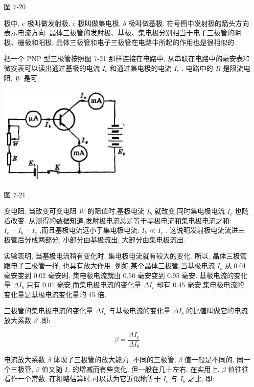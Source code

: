 \documentclass[10pt]{article}
\begin{document}
图 7-20

极中, \(e\) 极叫做发射极, \(c\) 极叫做集电极, \(b\) 极叫做基极. 符号图中发射极的箭头方向表示电流方向. 晶体三极管的发射极、基极、集电极分别相当于电子三极管的阴极、栅极和阳极. 晶体三极管和电子三极管在电路中所起的作用也是很相似的.

把一个 PNP 型三极管按照图 7-21 那样连接在电路中, 从串联在电路中的毫安表和微安表可以读出通过基极的电流 \({I}_{b}\) 和通过集电极的电流 \({I}_{c}\) . 电路中的 \(R\) 是限流电阻, \(W\) 是可

\begin{center}
\includegraphics[max width=0.5\textwidth]{images/01913056-1f15-74d8-9184-9aab52c9d66b_232_266290.jpg}
\end{center}

图 7-21

变电阻. 当改变可变电阻 \(W\) 的阻值时,基极电流 \({I}_{b}\) 就改变,同时集电极电流 \({I}_{c}\) 也随着改变. 从测得的数据知道,发射极电流总是等于基极电流和集电极电流之和: \({I}_{e} - {I}_{b} - {I}_{c}\) ,而且基极电流远小于集电极电流: \({I}_{b} \ll {I}_{c}\) . 这说明发射极电流流进三极管后分成两部分, 小部分由基极流出, 大部分由集电极流出.

实验表明, 当基极电流稍有变化时, 集电极电流就有较大的变化. 所以, 晶体三极管跟电子三极管一样, 也具有放大作用. 例如,某个晶体三极管,当基极电流 \({I}_{b}\) 从 0.01 毫安变到 0.02 毫安时, 集电极电流就由 0.50 毫安变到 0.95 毫安. 基极电流的变化量 \(\Delta {I}_{b}\) 只有 0.01 毫安,而集电极电流的变化量 \(\Delta {I}_{c}\) 却有 0.45 毫安,集电极电流的变化量是基极电流变化量的 45 倍.

三极管的集电极电流的变化量 \(\Delta {I}_{c}\) 与基极电流的变化量 \(\Delta {I}_{b}\) 的比值叫做它的电流放大系数 \(\beta\) ,即:

\[
\beta = \frac{\Delta {I}_{c}}{\Delta {I}_{b}}
\]

电流放大系数 \(\beta\) 体现了三极管的放大能力. 不同的三极管, \(\beta\) 值一般是不同的. 同一个三极管, \(\beta\) 值又随 \({I}_{c}\) 的增减而有些变化. 但一般在几十左右. 在实用上, \(\beta\) 值往往看作一个常数. 在粗略估算时,可以认为它近似地等于 \({I}_{c}\) 与 \({I}_{b}\) 之比, 即:
\end{document}
